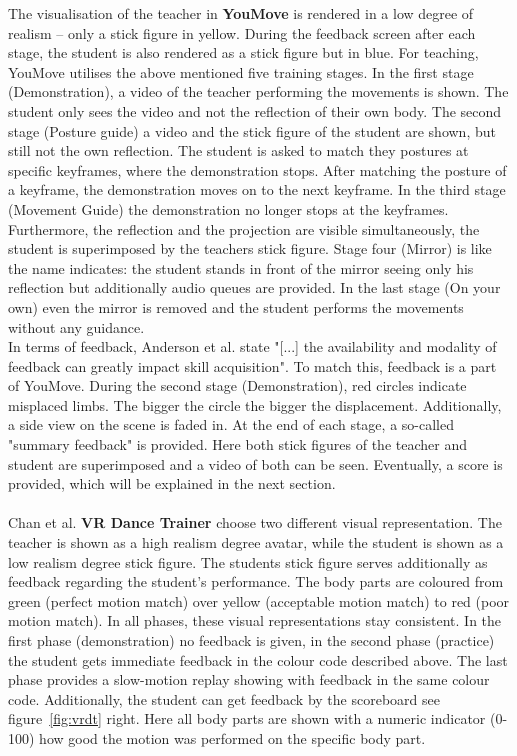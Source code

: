 The visualisation of the teacher in \textbf{YouMove} \cite{Anderson2013a} is rendered in a low degree of realism \--- only a stick figure in yellow. During the feedback screen after each stage, the student is also rendered as a stick figure but in blue. For teaching, YouMove utilises the above mentioned five training stages. In the first stage (Demonstration), a video of the teacher performing the movements is shown. The student only sees the video and not the reflection of their own body. The second stage (Posture guide) a video and the stick figure of the student are shown, but still not the own reflection. The student is asked to match they postures at specific keyframes, where the demonstration stops. After matching the posture of a keyframe, the demonstration moves on to the next keyframe. In the third stage (Movement Guide) the demonstration no longer stops at the keyframes. Furthermore, the reflection and the projection are visible simultaneously, the student is superimposed by the teachers stick figure. Stage four (Mirror) is like the name indicates: the student stands in front of the mirror seeing only his reflection but additionally audio queues are provided. In the last stage (On your own) even the mirror is removed and the student performs the movements without any guidance.\\
In terms of feedback, Anderson et al. state "[...] the availability and modality of feedback can greatly impact skill acquisition". To match this, feedback is a part of YouMove. During the second stage (Demonstration), red circles indicate misplaced limbs. The bigger the circle the bigger the displacement. Additionally, a side view on the scene is faded in. At the end of each stage, a so-called "summary feedback" is provided. Here both stick figures of the teacher and student are superimposed and a video of both can be seen. Eventually, a score is provided, which will be explained in the next section.\\ \\
Chan et al. \textbf{VR Dance Trainer}\cite{Chan2010} choose two different visual representation. The teacher is shown as a high realism degree avatar, while the student is shown as a low realism degree stick figure. The students stick figure serves additionally as feedback regarding the student's performance. The body parts are coloured from green (perfect motion match) over yellow (acceptable motion match) to red (poor motion match). In all phases, these visual representations stay consistent. In the first phase (demonstration) no feedback is given, in the second phase (practice) the student gets immediate feedback in the colour code described above. The last phase provides a slow-motion replay showing with feedback in the same colour code. Additionally, the student can get feedback by the scoreboard see figure~\ref{fig:vrdt} right. Here all body parts are shown with a numeric indicator (0-100) how good the motion was performed on the specific body part.

